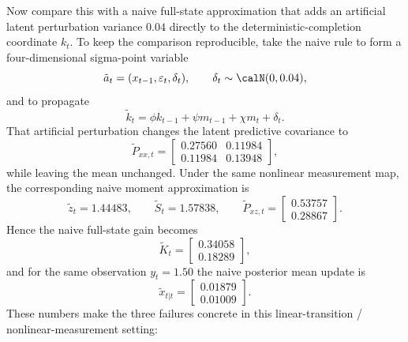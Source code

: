 Now compare this with a naive full-state approximation that adds an artificial
latent perturbation variance $0.04$ directly to the deterministic-completion
coordinate $k_t$.  To keep the comparison reproducible, take the naive rule to
form a four-dimensional sigma-point variable
\[
  \tilde a_t=(x_{t-1},\varepsilon_t,\delta_t),
  \qquad
  \delta_t\sim\calN(0,0.04),
\]
and to propagate
\[
  \tilde k_t
  =
  \phi k_{t-1}+\psi m_{t-1}+\chi m_t+\delta_t.
\]
That artificial perturbation changes the latent predictive covariance to
\[
  \tilde P_{xx,t}
  =
  \begin{bmatrix}
    0.27560 & 0.11984\\
    0.11984 & 0.13948
  \end{bmatrix},
\]
while leaving the mean unchanged.  Under the same nonlinear
measurement map, the corresponding naive moment approximation is
\[
  \tilde z_t = 1.44483,
  \qquad
  \tilde S_t = 1.57838,
  \qquad
  \tilde P_{xz,t}
  =
  \begin{bmatrix}
    0.53757\\ 0.28867
  \end{bmatrix}.
\]
Hence the naive full-state gain becomes
\[
  \tilde K_t
  =
  \begin{bmatrix}
    0.34058\\ 0.18289
  \end{bmatrix},
\]
and for the same observation $y_t=1.50$ the naive posterior mean update is
\[
  \tilde x_{t|t}
  =
  \begin{bmatrix}
    0.01879\\ 0.01009
  \end{bmatrix}.
\]
These numbers make the three failures concrete in this linear-transition /
nonlinear-measurement setting:
